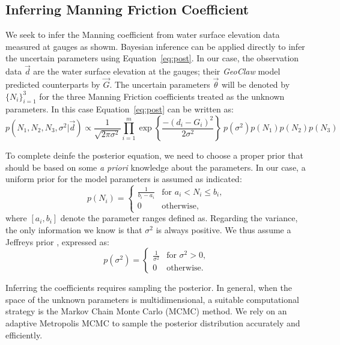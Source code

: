 \subsection{Inferring Manning Friction Coefficient}
 \label{sec:manning}
 
We seek to infer the Manning coefficient from water surface elevation
data measured at gauges as showm.
Bayesian inference can be applied directly to infer the uncertain parameters
using Equation~\ref{eq:post}. In our case, the observation data $\vec d$ 
are the water surface elevation at the gauges;
their \emph{GeoClaw} model predicted counterparts by $\vec G$.
The uncertain parameters $\vec \theta$ will be denoted by $\{N_i\}_{i=1}^3$ for the
three Manning Friction coefficients treated as the unknown parameters. 
In this case  Equation~\ref{eq:post} can be written as:
\begin{equation} 
p(N_1,N_2,N_3,\sigma^2 | \vec d) 
\propto \frac{1}{\sqrt{2 \pi \sigma^2}} 
 \prod_{i=1}^m  
\exp \left\lbrace \frac{-(d_i - G_i)^2}{2 \sigma^2} \right\rbrace
\ p(\sigma^2)p(N_1)p(N_2) p(N_3)
\label{eq:post_coef}
\end{equation}

To complete deinfe the posterior equation, we need to choose a proper prior that should be based 
on some \emph{a priori} knowledge about the parameters. In our case, a uniform
prior for the model parameters is assumed as indicated:
\begin{equation} 
p(N_i) = \begin{cases}
		\displaystyle \frac{1}{b_i-a_i} &\text{for~} a_i <  N_i \leq b_i ,  \\
		0 &\text{otherwise}  , 
\end{cases}
\end{equation}
where $ [a_i,b_i]$ denote the parameter ranges defined as.
Regarding the variance, the only information we know 
is that $\sigma^2$ is always positive.
We thus assume a Jeffreys prior \citep{sivia}, expressed as:
\begin{equation} 
p(\sigma^2) =  \begin{cases}
		\displaystyle \frac{1}{\sigma^2} &\text{for~} \sigma^2 > 0,  \\
		0 &\text{otherwise}. 
		\end{cases}
\label{eq:var_pr}
\end{equation}

Inferring the coefficients requires 
sampling the posterior. In general, when the space of the unknown 
parameters is multidimensional, a suitable computational strategy is 
the Markov Chain Monte  Carlo (MCMC) method. 
We rely on an adaptive Metropolis MCMC \citep{Gareth2009,Haario2001} to
sample the posterior distribution accurately and efficiently.


